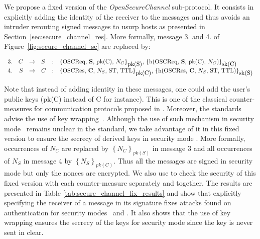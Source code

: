 We propose a fixed version of the {\em OpenSecureChannel} sub-protocol.
It consists in explicitly adding the identity of the receiver to the messages
and thus  avoids an intruder rerouting signed messages to usurp hosts as
presented in Section~\ref{sec:secure_channel_res}.
More formally, message 3. and 4. of Figure~\ref{fig:secure_channel_se} are replaced
by:
\arraycolsep=1.4pt
{\small
\begin{flushleft}
    $\begin{array}{lrllll}
        3. & C & \rightarrow & S & : & \text{\sm{\oscreq, {\bf S}, pk(C), $N_{C}$}{pk(S)}{sk(C)}}\\
        4. & S & \rightarrow & C & : & \text{\sm{\oscres, {\bf C}, $N_{S}$, ST, TTL}{pk(C)}{sk(S)}}\\
    \end{array}$
\end{flushleft}
}

Note that instead of adding identity in these messages, one could add the user's
public keys (pk(C) instead of C for instance).
This is one of the classical counter-measures for communication protocols
proposed in \cite{AN96}.
Moreover, the \opcua{} standards~\cite{MLD09,opcua_part2,opcua_part4,opcua_part6}
advise the use of key wrapping~\cite{FLS11}.
Although the use of such mechanism in security mode \sms~remains unclear in the
standard, we take advantage of it in this fixed version to ensure the secrecy of
derived keys in security mode \sms.
More formally, occurrences of $N_{C}$ are replaced by
$\left\{\mbox{$N_{C}$}\right\}_{pk(S)}$ in message 3 and all occurrences of
$N_{S}$ in message 4 by $\left\{\mbox{$N_{S}$}\right\}_{pk(C)}$.
Thus all the messages are signed in security mode \sms{} but only the nonces are
encrypted.
We also use \proverif to check the security of this fixed version with each
counter-measure separately and together.
The results are presented in Table \ref{tab:secure_channel_fix_results} and show
that explicitly specifying the receiver of a message in its signature fixes
attacks found on authentication for security modes \sms~and \smse.
It also shows that the use of key wrapping ensures the secrecy of the keys for
security mode \sms{} since the key is never sent in clear.


